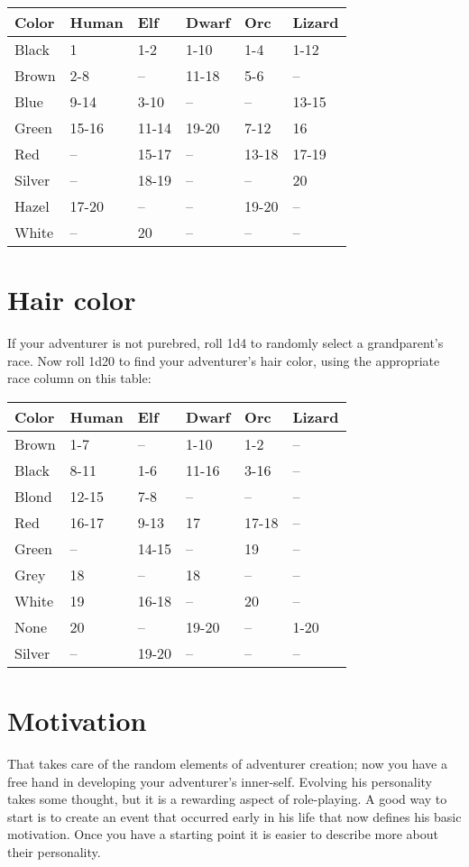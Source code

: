 \begin{normboxc}
\small
\begin{tabular}{@{}l l l l l l}
\textbf{Color} & \textbf{Human} & \textbf{Elf} & \textbf{Dwarf} & \textbf{Orc} & \textbf{Lizard}\\
\midrule
Black & 1 & 1-2 & 1-10 & 1-4 & 1-12\\
Brown & 2-8 & -- & 11-18 & 5-6 & --\\
Blue & 9-14 & 3-10 & -- & -- & 13-15\\
Green & 15-16 & 11-14 & 19-20 & 7-12 & 16\\
Red & -- & 15-17 & -- & 13-18 & 17-19\\
Silver & -- & 18-19 & -- & -- & 20\\
Hazel & 17-20 & -- & -- & 19-20 & --\\
White & -- & 20 & -- & -- & --
\end{tabular}
\end{normboxc}
\section{Hair color}


If your adventurer is not purebred, roll 1d4 to randomly select a grandparent's race. Now roll 1d20 to find your adventurer's hair color, using the appropriate race column on this table:

\begin{normboxc}
\small
\begin{tabular}{@{}l l l l l l}
\textbf{Color} & \textbf{Human} & \textbf{Elf} & \textbf{Dwarf} & \textbf{Orc} & \textbf{Lizard}\\
\midrule

Brown & 1-7 & -- & 1-10 & 1-2 & --\\
Black & 8-11 & 1-6 & 11-16 & 3-16 & --\\
Blond & 12-15 & 7-8 & -- & -- & --\\
Red & 16-17 & 9-13 & 17 & 17-18 & --\\
Green & -- & 14-15 & -- & 19 & --\\
Grey & 18 & -- & 18 & -- & --\\
White & 19 & 16-18 & -- & 20 & --\\
None & 20 & -- & 19-20 & -- & 1-20\\
Silver & -- & 19-20 & -- & -- & --
\end{tabular}
\end{normboxc}
\section{Motivation}
That takes care of the random elements of adventurer creation; now you have a free hand in developing your adventurer's inner-self. Evolving his personality takes some thought, but it is a rewarding aspect of role-playing. A good way to start is to create an event that occurred early in his life that now defines his basic motivation. Once you have a starting point it is easier to describe more about their personality.

